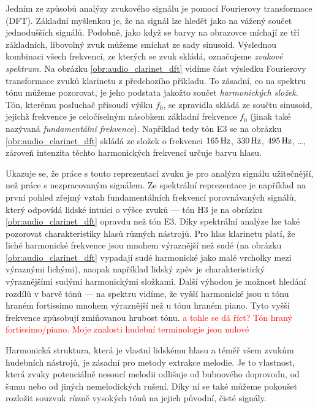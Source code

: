 Jedním ze způsobů analýzy zvukového signálu je pomocí Fourierovy transformace (DFT). Základní myšlenkou je, že na signál lze hledět jako na vážený součet jednodušších signálů. Podobně, jako když se barvy na obrazovce míchají ze tří základních, libovolný zvuk můžeme smíchat ze sady sinusoid. Výslednou kombinaci všech frekvencí, ze kterých se zvuk skládá, označujeme \emph{zvukové spektrum}. Na obrázku \ref{obr:audio_clarinet_dft} vidíme část výsledku Fourierovy transformace zvuků klarinetu z předchozího příkladu. To zásadní, co na spektru tónu můžeme pozorovat, je jeho podstata jakožto součet \emph{harmonických složek}. Tón, kterému posluchač přisoudí výšku $f_0$, se zpravidla skládá ze součtu sinusoid, jejichž frekvence je celočíselným násobkem základní frekvence $f_0$ (jinak také nazývaná \emph{fundamentální frekvence}). Například tedy tón E3 se na obrázku \ref{obr:audio_clarinet_dft} skládá ze složek o frekvenci $165\,\rm Hz$, $330\,\rm Hz$, $495\,\rm Hz$, \dots, zároveň intenzita těchto harmonických frekvencí určuje barvu hlasu.

Ukazuje se, že práce s touto reprezentací zvuku je pro analýzu signálu užitečnější, než práce s nezpracovaným signálem. Ze spektrální reprezentace je například na první pohled zřejmý vztah fundamentálních frekvencí porovnávaných signálů, který odpovídá lidské intuici o výšce zvuků --- tón H3 je na obrázku \ref{obr:audio_clarinet_dft} opravdu  než tón E3. Díky spektrální analýze lze také pozorovat charakteristiky hlasů různých nástrojů. Pro hlas klarinetu platí, že liché harmonické frekvence jsou mnohem výraznější než sudé (na obrázku \ref{obr:audio_clarinet_dft} vypadají sudé harmonické jako malé vrcholky mezi výraznými lichými), naopak například lidský zpěv je charakteristický výraznějšími sudými harmonickými složkami. Další výhodou je možnost hledání rozdílů v barvě tónů --- na spektru vidíme, že vyšší harmonické jsou u tónu hraném fortissimo mnohem výraznější než u tónu hraném piano. Tyto vyšší frekvence způsobují zmiňovanou hrubost tónu. \textcolor{red}{a tohle se dá říct? Tón hraný fortissimo/piano. Moje znalosti hudební terminologie jsou nulové}

Harmonická struktura, která je vlastní lidskému hlasu a téměř všem zvukům hudebních nástrojů, je zásadní pro metody extrakce melodie. Je to vlastnost, která zvuky potenciálně nesoucí melodii odlišuje od bubnového doprovodu, od šumu nebo od jiných nemelodických rušení. Díky ní se také můžeme pokoušet rozložit souzvuk různě vysokých tónů na jejich původní, čisté signály. 

